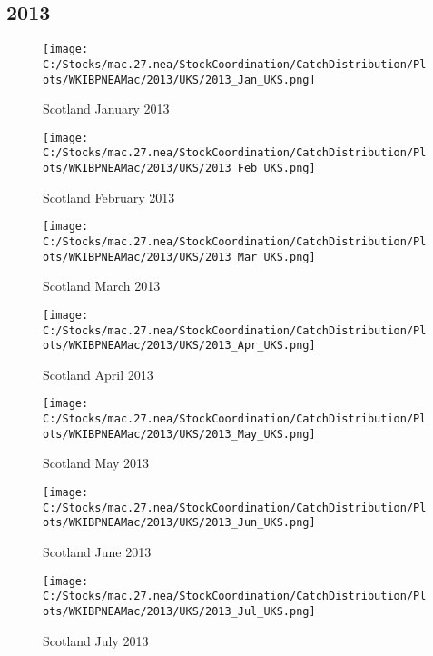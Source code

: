 \documentclass{article}
\begin{document}
\subsection{2013}



\begin{figure}[h]
	\centering
		\texttt{[image: C:/Stocks/mac.27.nea/StockCoordination/CatchDistribution/Plots/WKIBPNEAMac/2013/UKS/2013\_Jan\_UKS.png]}
	\caption{Scotland January 2013}
	\label{fig:2013_Jan_UKS}
\end{figure}

\begin{figure}
	\centering
		\texttt{[image: C:/Stocks/mac.27.nea/StockCoordination/CatchDistribution/Plots/WKIBPNEAMac/2013/UKS/2013\_Feb\_UKS.png]}
	\caption{Scotland February 2013}
	\label{fig:2013_Feb_UKS}
\end{figure}

\begin{figure}
	\centering
		\texttt{[image: C:/Stocks/mac.27.nea/StockCoordination/CatchDistribution/Plots/WKIBPNEAMac/2013/UKS/2013\_Mar\_UKS.png]}
	\caption{Scotland March 2013}
	\label{fig:2013_Mar_UKS}
\end{figure}

\begin{figure}
	\centering
		\texttt{[image: C:/Stocks/mac.27.nea/StockCoordination/CatchDistribution/Plots/WKIBPNEAMac/2013/UKS/2013\_Apr\_UKS.png]}
	\caption{Scotland April 2013}
	\label{fig:2013_Apr_UKS}
\end{figure}

\begin{figure}
	\centering
		\texttt{[image: C:/Stocks/mac.27.nea/StockCoordination/CatchDistribution/Plots/WKIBPNEAMac/2013/UKS/2013\_May\_UKS.png]}
	\caption{Scotland May 2013}
	\label{fig:2013_May_UKS}
\end{figure}

\begin{figure}
	\centering
		\texttt{[image: C:/Stocks/mac.27.nea/StockCoordination/CatchDistribution/Plots/WKIBPNEAMac/2013/UKS/2013\_Jun\_UKS.png]}
	\caption{Scotland June 2013}
	\label{fig:2013_Jun_UKS}
\end{figure}

\begin{figure}
	\centering
		\texttt{[image: C:/Stocks/mac.27.nea/StockCoordination/CatchDistribution/Plots/WKIBPNEAMac/2013/UKS/2013\_Jul\_UKS.png]}
	\caption{Scotland July 2013}
	\label{fig:2013_Jul_UKS}
\end{figure}
\end{document}
